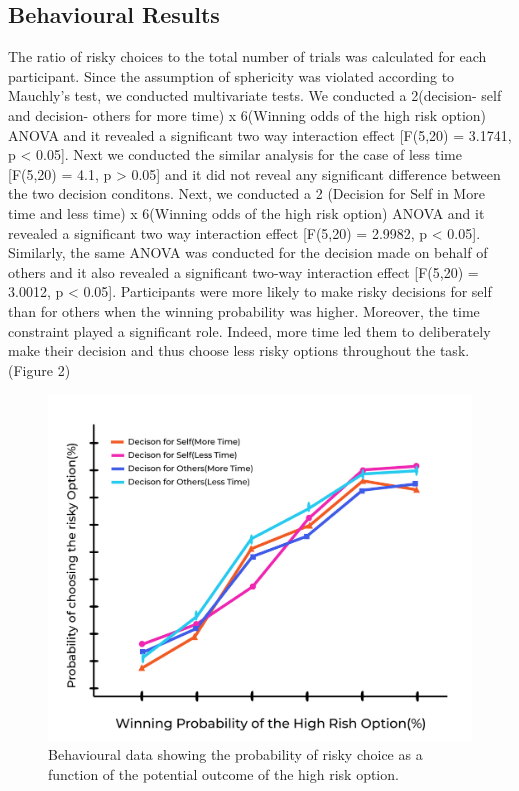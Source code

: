 \documentclass[11pt]{article}
\begin{document}
\subsection{Behavioural Results}
The ratio of risky choices to the total number of trials was calculated for each participant. Since the assumption of sphericity was violated according to Mauchly's test, we conducted multivariate tests. We conducted a 2(decision- self and decision- others for more time) x 6(Winning odds of the high risk option) ANOVA and it revealed a significant two way interaction effect [F(5,20) = 3.1741, p < 0.05]. Next we conducted the similar analysis for the case of less time [F(5,20) = 4.1, p > 0.05] and it did not reveal any significant difference between the two decision conditons. Next, we conducted a 2 (Decision for Self in More time and less time) x 6(Winning odds of the high risk option) ANOVA and it revealed a significant two way interaction effect [F(5,20) = 2.9982, p < 0.05]. Similarly, the same ANOVA was conducted for the decision made on behalf of others and it also revealed a significant two-way interaction effect [F(5,20) = 3.0012, p < 0.05]. Participants were more likely to make risky decisions for self than for others when the winning probability was higher. Moreover, the time constraint played a significant role. Indeed, more time led them to deliberately make their decision and thus choose less risky options throughout the task. (Figure 2)

\begin{figure}[H]
    \centering
        \includegraphics[scale=0.4]{figures/behav.jpg}
    \caption{ Behavioural data showing the probability of risky choice as a function of the potential outcome of the high risk option.}
    \label{fig:2}
\end{figure}
\end{document}
